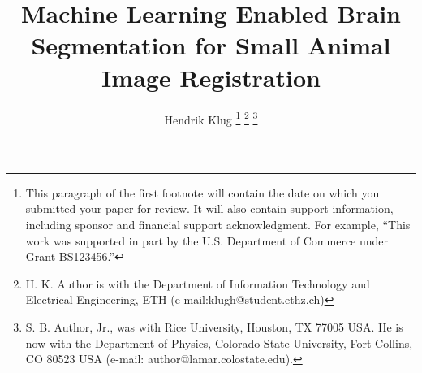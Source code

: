 \documentclass[journal,twoside,web,english]{ieeecolor}
\title{Machine Learning Enabled Brain Segmentation for Small Animal Image Registration}
\author{
	Hendrik Klug
	\newline
\thanks{This paragraph of the first footnote will contain the date on which
you submitted your paper for review. It will also contain support information,
including sponsor and financial support acknowledgment. For example,
``This work was supported in part by the U.S. Department of Commerce under Grant BS123456.'' }
\thanks{H. K. Author is with the Department of Information Technology and Electrical Engineering, ETH (e-mail:klugh@student.ethz.ch)}
\thanks{S. B. Author, Jr., was with Rice University, Houston, TX 77005 USA.
He is now with the Department of Physics, Colorado State University,
Fort Collins, CO 80523 USA (e-mail: author@lamar.colostate.edu).}}
\date{}
\begin{document}
\maketitle
\noindent









\clearpage

%
\end{document}
